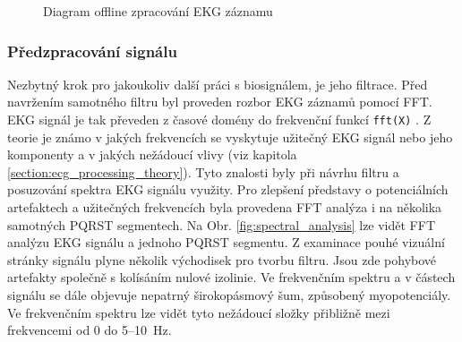 \begin{figure}[H]
    \centering
    \caption{Diagram offline zpracování EKG záznamu}
    \label{fig:diagram_offline_processing}
\end{figure}

\subsubsection{Předzpracování signálu}
\label{section:preprocessing}
Nezbytný krok pro jakoukoliv další práci s biosignálem, je jeho filtrace. Před
navržením samotného filtru byl proveden rozbor EKG záznamů pomocí FFT. EKG
signál je tak převeden z časové domény do frekvenční funkcí \texttt{fft(X)}
\cite{matlabFFT}. Z teorie je známo v jakých frekvencích se vyskytuje užitečný
EKG signál nebo jeho komponenty a v jakých nežádoucí vlivy (viz kapitola
\ref{section:ecg_processing_theory}). Tyto znalosti byly při návrhu filtru a
posuzování spektra EKG signálu využity. Pro zlepšení představy o potenciálních
artefaktech a užitečných frekvencích byla provedena FFT analýza i na několika
samotných PQRST segmentech. Na Obr. \ref{fig:spectral_analysis} lze vidět FFT
analýzu EKG signálu a jednoho PQRST segmentu. Z examinace pouhé vizuální stránky
signálu plyne několik východisek pro tvorbu filtru. Jsou zde pohybové artefakty
společně s kolísáním nulové izolinie. Ve frekvenčním spektru a v částech signálu
se dále objevuje nepatrný širokopásmový šum, způsobený myopotenciály. Ve
frekvenčním spektru lze vidět tyto nežádoucí složky přibližně mezi frekvencemi
od 0 do 5--10~\si\Hz.

